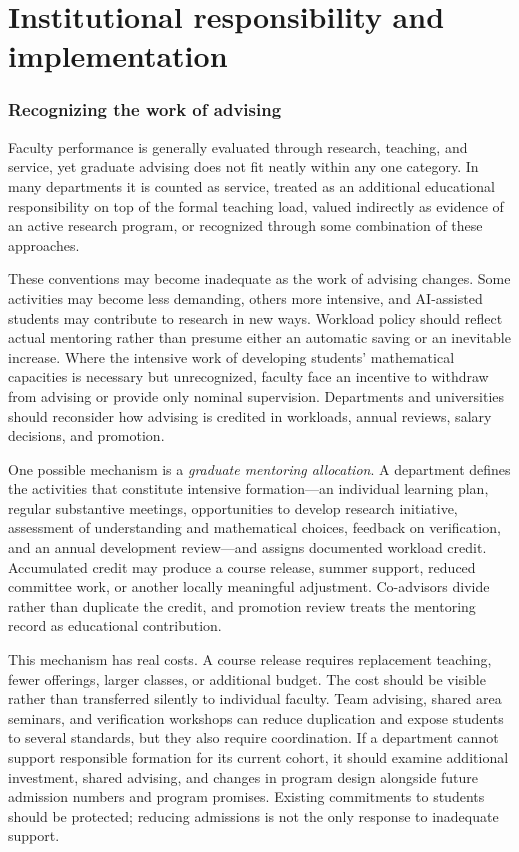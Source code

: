 \documentclass[11pt]{article}
\newcommand{\term}[1]{\emph{#1}}
\begin{document}
\clearpage
\part{Institutional responsibility and implementation}

\section{Recognizing the work of advising}
\label{sec:advising-work}

Faculty performance is generally evaluated through research, teaching, and service, yet
graduate advising does not fit neatly within any one category.  In many departments it is
counted as service, treated as an additional educational responsibility on top of the
formal teaching load, valued indirectly as evidence of an active research program, or
recognized through some combination of these approaches.

These conventions may become inadequate as the work of advising changes. Some
activities may become less demanding, others more intensive, and AI-assisted students
may contribute to research in new ways. Workload policy should reflect actual mentoring
rather than presume either an automatic saving or an inevitable increase. Where
the intensive work of developing students' mathematical capacities is necessary but
unrecognized, faculty face an incentive to withdraw
from advising or provide only nominal supervision.  Departments and universities should reconsider how advising is credited in
workloads, annual reviews, salary decisions, and promotion.

One possible mechanism is a \term{graduate mentoring allocation}.  A department defines
the activities that constitute intensive formation---an individual learning plan,
regular substantive meetings, opportunities to develop research initiative, assessment
of understanding and mathematical choices, feedback on verification, and an annual
development review---and assigns documented workload credit.
Accumulated credit may produce a course release, summer support, reduced committee work,
or another locally meaningful adjustment.  Co-advisors divide rather than duplicate the
credit, and promotion review treats the mentoring record as educational contribution.

This mechanism has real costs.  A course release requires replacement teaching, fewer
offerings, larger classes, or additional budget.  The cost should be visible rather than
transferred silently to individual faculty.  Team advising, shared area seminars, and
verification workshops can reduce duplication and expose students to several standards,
but they also require coordination. If a department cannot support responsible formation
for its current cohort, it should examine additional investment, shared advising, and
changes in program design alongside future admission numbers and program promises.
Existing commitments to students should be protected; reducing admissions is not the
only response to inadequate support.
\end{document}
